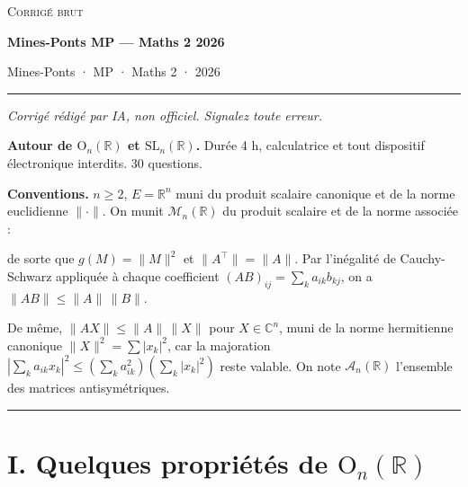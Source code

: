 \documentclass[11pt,a4paper]{article}
\newcommand{\equationajustee}[1]{%
  \sbox{\boiteequation}{$\displaystyle #1$}%
  \ifdim\wd\boiteequation>\linewidth
    \[\resizebox{\linewidth}{!}{\usebox{\boiteequation}}\]%
  \else
    \[#1\]%
  \fi}
\begin{document}
\thispagestyle{plain}
\begin{center}
  {\small\scshape Corrigé brut}\par\smallskip
  {\LARGE\bfseries Mines-Ponts MP — Maths 2 2026\par}\medskip
  {\large Mines-Ponts · MP · Maths 2 · 2026\par}
\end{center}
\vspace{2pt}\hrule\vspace{8pt}

\emph{Corrigé rédigé par IA, non officiel. Signalez toute erreur.}

\textbf{Autour de \({\mathrm{O}}_n(\mathbb{R})\) et \({\mathrm{SL}}_n(\mathbb{R})\).} Durée 4 h, calculatrice et tout dispositif électronique interdits. 30 questions.

\textbf{Conventions.} \(n\ge 2\), \(E={\mathbb{R}}^n\) muni du produit scalaire canonique et de la norme euclidienne \(\|\cdot\|\). On munit \({\mathcal{M}}_n(\mathbb{R})\) du produit scalaire et de la norme associée :

\equationajustee{\begin{aligned}\langle A,B\rangle&=\operatorname{tr}(A^\top B)=\sum_{i,j}a_{ij}b_{ij},\\\|A\|&=\sqrt{\langle A,A\rangle},\end{aligned}}

de sorte que \(g(M)=\|M\|^2\) et \(\|A^\top\|=\|A\|\). Par l'inégalité de Cauchy-Schwarz appliquée à chaque coefficient \((AB)_{ij}=\sum_k a_{ik}b_{kj}\), on a \(\|AB\|\le\|A\|\,\|B\|\).

De même, \(\|AX\|\le\|A\|\,\|X\|\) pour \(X\in{\mathbb{C}}^n\), muni de la norme hermitienne canonique \(\|X\|^2=\sum|x_k|^2\), car la majoration \(|\sum_k a_{ik}x_k|^2\le(\sum_k a_{ik}^2)(\sum_k|x_k|^2)\) reste valable. On note \({\mathcal{A}}_n(\mathbb{R})\) l'ensemble des matrices antisymétriques.

\begin{center}\rule{0.5\linewidth}{0.5pt}\end{center}

\hypertarget{i.-quelques-propriuxe9tuxe9s-de-mathrmo_nmathbbr}{%
\section{\texorpdfstring{I. Quelques propriétés de \({\mathrm{O}}_n(\mathbb{R})\)}{I. Quelques propriétés de \{\textbackslash mathrm\{O\}\}\_n(\textbackslash mathbb\{R\})}}\label{i.-quelques-propriuxe9tuxe9s-de-mathrmo_nmathbbr}}
\end{document}
